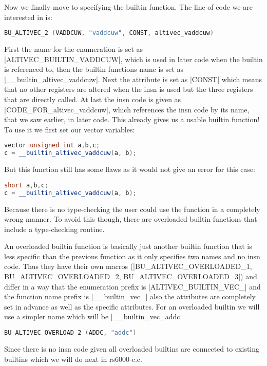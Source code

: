 Now we finally move to specifying the builtin function. The line of code we are interested in is:
\begin{lstlisting}[language=C++,basicstyle=\ttfamily\scriptsize,keywordstyle=\color{red}]
BU_ALTIVEC_2 (VADDCUW, "vaddcuw", CONST, altivec_vaddcuw)
\end{lstlisting}
First the name for the enumeration is set as |ALTIVEC_BUILTIN_VADDCUW|, which is used in later code when the builtin is referenced to, then the builtin functions name is set as |__builtin_altivec_vaddcuw|. Next the attribute is set as |CONST| which means that no other registers are altered when the insn is used but the three registers that are directly called. At last the insn code is given as |CODE_FOR_altivec_vaddcuw|, which references the insn code by its name, that we saw earlier, in later code. This already gives us a usable builtin function! To use it we first set our vector variables:
\begin{lstlisting}[language=C++,basicstyle=\ttfamily\scriptsize,keywordstyle=\color{red}]
vector unsigned int a,b,c;
c = __builtin_altivec_vaddcuw(a, b);
\end{lstlisting}
But this function still has some flaws as it would not give an error for this case:
\begin{lstlisting}[language=C++,basicstyle=\ttfamily\scriptsize,keywordstyle=\color{red}]
short a,b,c;
c = __builtin_altivec_vaddcuw(a, b);
\end{lstlisting}
Because there is no type-checking the user could use the function in a completely wrong manner. To avoid this though, there are overloaded builtin functions that include a type-checking routine.

An overloaded builtin function is basically just another builtin function that is less specific than the previous function as it only specifies two names and no insn code. Thus they have their own macros (|BU_ALTIVEC_OVERLOADED_1, BU_ALTIVEC_OVERLOADED_2, BU_ALTIVEC_OVERLOADED_3|) and differ in a way that the enumeration prefix is |ALTIVEC_BUILTIN_VEC_| and the function name prefix is |__builtin_vec_| also the attributes are completely set in advance as well as the specific attributes.
For an overloaded builtin we will use a simpler name which will be  |__builtin_vec_addc|
\begin{lstlisting}[language=C++,basicstyle=\ttfamily\scriptsize,keywordstyle=\color{red}]
BU_ALTIVEC_OVERLOAD_2 (ADDC, "addc")
\end{lstlisting}
Since there is no insn code given all overloaded builtins are connected to existing builtins which we will do next in rs6000-c.c.

